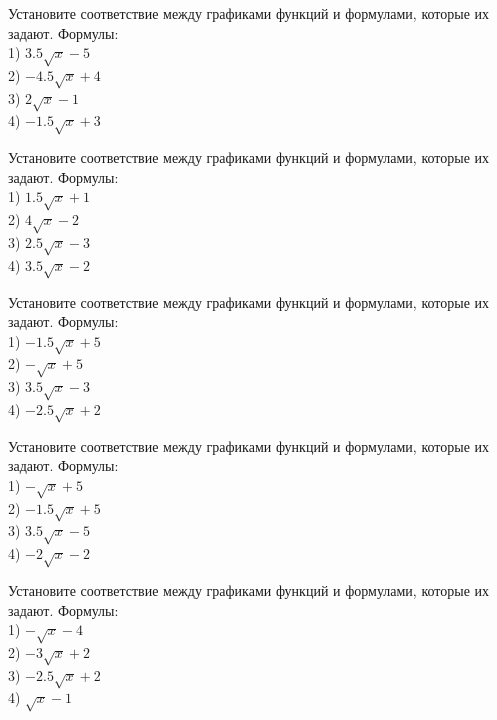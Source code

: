 \documentclass[4apaper]{article}
\begin{document}
\begin{taskBN}{51}
Установите соответствие между графиками функций и формулами, которые их задают. Формулы: \\1) $3.5\sqrt{x}-5$\\2) $-4.5\sqrt{x}+4$\\3) $2\sqrt{x}-1$\\4) $-1.5\sqrt{x}+3$
\end{taskBN}

\begin{taskBN}{52}
Установите соответствие между графиками функций и формулами, которые их задают. Формулы: \\1) $1.5\sqrt{x}+1$\\2) $4\sqrt{x}-2$\\3) $2.5\sqrt{x}-3$\\4) $3.5\sqrt{x}-2$
\end{taskBN}

\begin{taskBN}{53}
Установите соответствие между графиками функций и формулами, которые их задают. Формулы: \\1) $-1.5\sqrt{x}+5$\\2) $-\sqrt{x}+5$\\3) $3.5\sqrt{x}-3$\\4) $-2.5\sqrt{x}+2$
\end{taskBN}

\begin{taskBN}{54}
Установите соответствие между графиками функций и формулами, которые их задают. Формулы: \\1) $-\sqrt{x}+5$\\2) $-1.5\sqrt{x}+5$\\3) $3.5\sqrt{x}-5$\\4) $-2\sqrt{x}-2$
\end{taskBN}

\begin{taskBN}{55}
Установите соответствие между графиками функций и формулами, которые их задают. Формулы: \\1) $-\sqrt{x}-4$\\2) $-3\sqrt{x}+2$\\3) $-2.5\sqrt{x}+2$\\4) $\sqrt{x}-1$
\end{taskBN}
\end{document}
